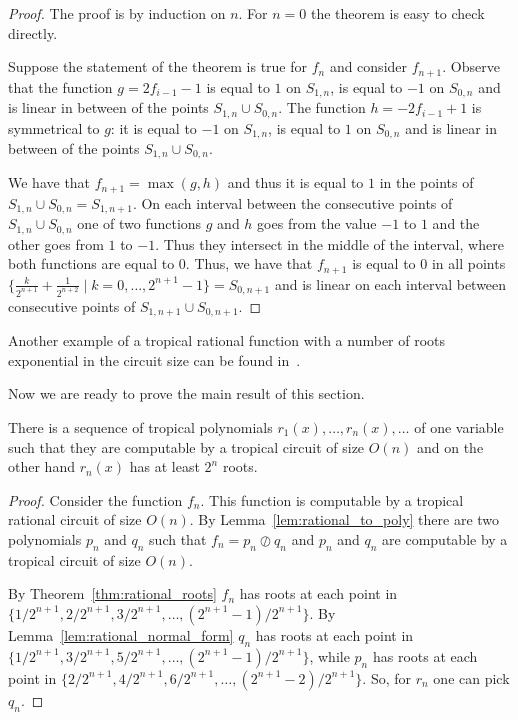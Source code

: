\documentclass[11pt]{article}
\newcommand{\td}{\oslash}
\begin{document}
\begin{proof}
The proof is by induction on $n$. For $n=0$ the theorem is easy to check directly.

Suppose the statement of the theorem is true for $f_n$ and consider $f_{n+1}$.
Observe that the function $g =2f_{i-1}-1$ is equal to $1$ on $S_{1,n}$, is equal to $-1$ on $S_{0,n}$ and is linear in between of the points $S_{1,n} \cup S_{0,n}$. The function $h = -2f_{i-1}+1$ is symmetrical to $g$: it is equal to $-1$ on $S_{1,n}$, is equal to $1$ on $S_{0,n}$ and is linear in between of the points $S_{1,n} \cup S_{0,n}$.

We have that $f_{n+1} = \max{(g,h)}$ and thus it is equal to $1$ in the points of $S_{1,n} \cup S_{0,n} = S_{1, n+1}$. On each interval between the consecutive points of $S_{1,n} \cup S_{0,n}$ one of two functions $g$ and $h$ goes from the value $-1$ to $1$ and the other goes from $1$ to $-1$. Thus they intersect in the middle of the interval, where both functions are equal to $0$. Thus, we have that $f_{n+1}$ is equal to $0$ in all points $\{ \frac{k}{2^{n+1}} + \frac{1}{2^{n+2}} \mid k=0,\ldots, 2^{n+1}-1\} = S_{0,n+1}$ and is linear on each interval between consecutive points of $S_{1,n+1} \cup S_{0,n+1}$.
\end{proof}

\begin{remark}
Another example of a tropical rational function with a number of roots exponential in the circuit size can be found in~\cite{AllamigeonBGJ18}.
\end{remark}

Now we are ready to prove the main result of this section.

\begin{theorem} \label{thm:tropical_circuits}
There is a sequence of tropical polynomials $r_1(x),\ldots, r_n(x), \ldots$ of one variable such that they are computable by a tropical circuit of size $O(n)$ and on the other hand $r_{n}(x)$ has at least $2^n$ roots.
\end{theorem}

\begin{proof}

Consider the function $f_{n}$. This function is computable by a tropical rational circuit of size $O(n)$. By Lemma~\ref{lem:rational_to_poly} there are two polynomials $p_n$ and $q_n$ such that $f_n = p_n \td q_n$ and $p_n$ and $q_n$ are computable by a tropical circuit of size $O(n)$.

By Theorem~\ref{thm:rational_roots} $f_{n}$ has roots at each point in $\{1/2^{n+1}, 2/2^{n+1}, 3/2^{n+1}, \ldots, (2^{n+1}-1)/2^{n+1}\}$. By Lemma~\ref{lem:rational_normal_form} $q_n$ has roots at each point in $\{1/2^{n+1}, 3/2^{n+1}, 5/2^{n+1}, \ldots, (2^{n+1}-1)/2^{n+1}\}$, while $p_n$ has roots at each point in $\{2/2^{n+1}, 4/2^{n+1}, 6/2^{n+1}, \ldots, (2^{n+1}-2)/2^{n+1}\}$. So, for $r_n$ one can pick $q_n$.
\end{proof}
\end{document}
